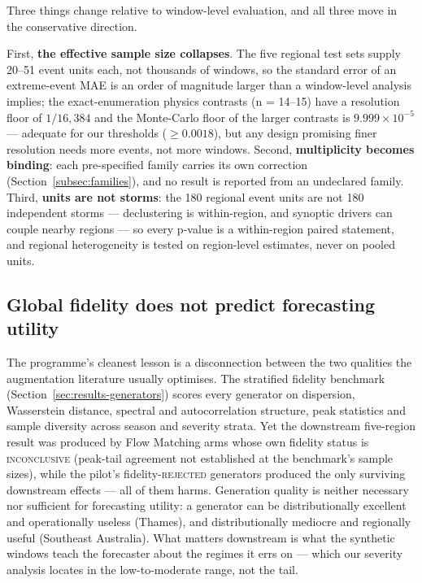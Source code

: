 Three things change relative to window-level evaluation, and all three move
in the conservative direction.

First, \textbf{the effective sample size collapses}. The five regional test
sets supply 20--51 event units each, not thousands of windows, so the
standard error of an extreme-event MAE is an order of magnitude larger than
a window-level analysis implies; the exact-enumeration physics contrasts
(n = 14--15) have a resolution floor of $1/16{,}384$ and the Monte-Carlo
floor of the larger contrasts is $9.999\times10^{-5}$ --- adequate for our
thresholds ($\ge 0.0018$), but any design promising finer resolution needs
more events, not more windows. Second, \textbf{multiplicity becomes
binding}: each pre-specified family carries its own correction
(Section~\ref{subsec:families}), and no result is reported from an
undeclared family. Third, \textbf{units are not storms}: the 180 regional
event units are not 180 independent storms --- declustering is
within-region, and synoptic drivers can couple nearby regions --- so every
p-value is a within-region paired statement, and regional heterogeneity is
tested on region-level estimates, never on pooled units.

\subsection{Global fidelity does not predict forecasting utility}
\label{subsec:why-fidelity-utility}

The programme's cleanest lesson is a disconnection between the two
qualities the augmentation literature usually optimises. The stratified
fidelity benchmark (Section~\ref{sec:results-generators}) scores every
generator on dispersion, Wasserstein distance, spectral and autocorrelation
structure, peak statistics and sample diversity across season and severity
strata. Yet the downstream five-region result was produced by Flow Matching
arms whose own fidelity status is \textsc{inconclusive} (peak-tail
agreement not established at the benchmark's sample sizes), while the
pilot's fidelity-\textsc{rejected} generators produced the only surviving
downstream effects --- all of them harms. Generation quality is neither
necessary nor sufficient for forecasting utility: a generator can be
distributionally excellent and operationally useless (Thames), and
distributionally mediocre and regionally useful (Southeast Australia). What
matters downstream is what the synthetic windows teach the forecaster about
the regimes it errs on --- which our severity analysis locates in the
low-to-moderate range, not the tail.

